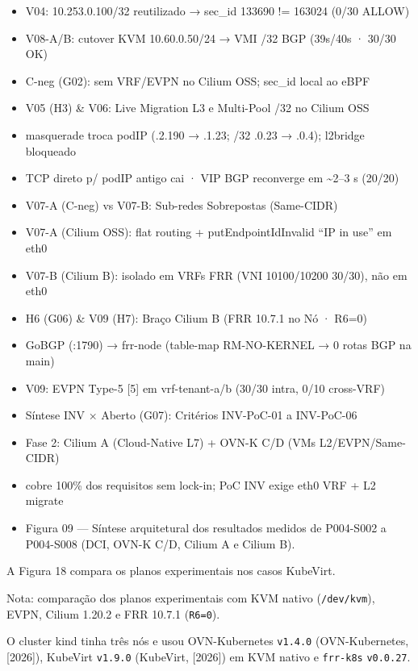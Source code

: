 \documentclass[12pt,openany,oneside,a4paper,chapter=TITLE,english,brazil]{abntex2}
\begin{document}
\begin{itemize}
\item
  V04: 10.253.0.100/32 reutilizado → sec\_id 133690 != 163024 (0/30 ALLOW)
\item
  V08-A/B: cutover KVM 10.60.0.50/24 → VMI /32 BGP (39s/40s · 30/30 OK)
\item
  C-neg (G02): sem VRF/EVPN no Cilium OSS; sec\_id local ao eBPF
\item
  V05 (H3) \& V06: Live Migration L3 e Multi-Pool /32 no Cilium OSS
\item
  masquerade troca podIP (.2.190 → .1.23; /32 .0.23 → .0.4); l2bridge bloqueado
\item
  TCP direto p/ podIP antigo cai · VIP BGP reconverge em \textasciitilde2--3 s (20/20)
\item
  V07-A (C-neg) vs V07-B: Sub-redes Sobrepostas (Same-CIDR)
\item
  V07-A (Cilium OSS): flat routing + putEndpointIdInvalid ``IP in use'' em eth0
\item
  V07-B (Cilium B): isolado em VRFs FRR (VNI 10100/10200 30/30), não em eth0
\item
  H6 (G06) \& V09 (H7): Braço Cilium B (FRR 10.7.1 no Nó · R6=0)
\item
  GoBGP (:1790) → frr-node (table-map RM-NO-KERNEL → 0 rotas BGP na main)
\item
  V09: EVPN Type-5 {[}5{]} em vrf-tenant-a/b (30/30 intra, 0/10 cross-VRF)
\item
  Síntese INV × Aberto (G07): Critérios INV-PoC-01 a INV-PoC-06
\item
  Fase 2: Cilium A (Cloud-Native L7) + OVN-K C/D (VMs L2/EVPN/Same-CIDR)
\item
  cobre 100\% dos requisitos sem lock-in; PoC INV exige eth0 VRF + L2 migrate
\item
  Figura 09 --- Síntese arquitetural dos resultados medidos de P004-S002 a P004-S008 (DCI, OVN-K C/D, Cilium A e Cilium B).
\end{itemize}

A Figura 18 compara os planos experimentais nos casos KubeVirt.

Nota: comparação dos planos experimentais com KVM nativo (\texttt{/\allowbreak{}dev/\allowbreak{}kvm}), EVPN, Cilium 1.20.2 e FRR 10.7.1 (\texttt{R6=\allowbreak{}0}).

O cluster kind tinha três nós e usou OVN-Kubernetes \texttt{v1.\allowbreak{}4.\allowbreak{}0} (OVN-Kubernetes, {[}2026{]}), KubeVirt \texttt{v1.\allowbreak{}9.\allowbreak{}0} (KubeVirt, {[}2026{]}) em KVM nativo e \texttt{frr-{}\allowbreak{}k8s} \texttt{v0.\allowbreak{}0.\allowbreak{}27}.
\end{document}
